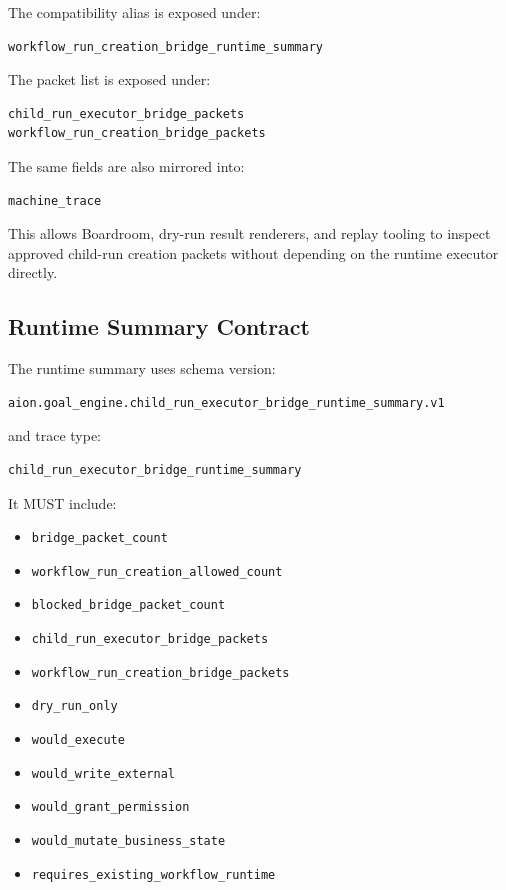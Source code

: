 The compatibility alias is exposed under:

\begin{verbatim}
workflow_run_creation_bridge_runtime_summary
\end{verbatim}

The packet list is exposed under:

\begin{verbatim}
child_run_executor_bridge_packets
workflow_run_creation_bridge_packets
\end{verbatim}

The same fields are also mirrored into:

\begin{verbatim}
machine_trace
\end{verbatim}

This allows Boardroom, dry-run result renderers, and replay tooling to inspect approved child-run creation packets without depending on the runtime executor directly.

\subsection{Runtime Summary Contract}

The runtime summary uses schema version:

\begin{verbatim}
aion.goal_engine.child_run_executor_bridge_runtime_summary.v1
\end{verbatim}

and trace type:

\begin{verbatim}
child_run_executor_bridge_runtime_summary
\end{verbatim}

It MUST include:

\begin{itemize}
  \item \texttt{bridge\_packet\_count}
  \item \texttt{workflow\_run\_creation\_allowed\_count}
  \item \texttt{blocked\_bridge\_packet\_count}
  \item \texttt{child\_run\_executor\_bridge\_packets}
  \item \texttt{workflow\_run\_creation\_bridge\_packets}
  \item \texttt{dry\_run\_only}
  \item \texttt{would\_execute}
  \item \texttt{would\_write\_external}
  \item \texttt{would\_grant\_permission}
  \item \texttt{would\_mutate\_business\_state}
  \item \texttt{requires\_existing\_workflow\_runtime}
\end{itemize}

